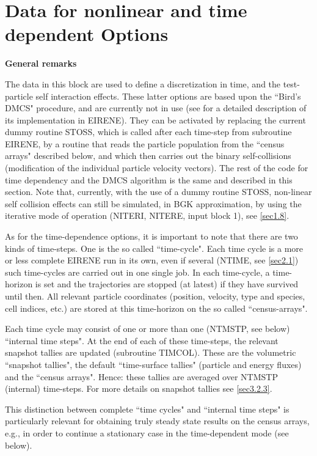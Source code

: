 \section{Data for nonlinear and time dependent Options} \label{sec2.13}

\textbf{General remarks} 

\medskip 

The data in this block are used to define a discretization in time, and the test-particle self interaction effects.
%
These latter options are based upon the ``Bird's \ac{DMCS}" procedure, and are currently not in use (see \cite{kn:Behringer} for a detailed description of its implementation in EIRENE).
They can be activated by replacing the current dummy routine STOSS, which is called after each time-step from subroutine EIRENE, by a routine that reads the particle population from the ``census arrays" described below, and which then carries out the binary self-collisions (modification of the individual particle velocity vectors).
The rest of the code for time dependency and the \ac{DMCS} algorithm is the same and described in this section.
Note that, currently, with the use of a dummy routine STOSS, non-linear self collision effects can still be simulated, in \ac{BGK} approximation, by using the iterative mode of operation (NITERI, NITERE, input block 1), see \cref{sec1.8}.

As for the time-dependence options, it is important to note that there are two kinds of time-steps.
One is the so called ``time-cycle".
Each time cycle is a more or less complete EIRENE run in its own, even if several (NTIME, see \cref{sec2.1}) such time-cycles are carried out in one single job.
In each time-cycle, a time-horizon is set and the trajectories are stopped (at latest) if they have survived until then.
All relevant particle coordinates (position, velocity, type and species, cell indices, etc.) are stored at this time-horizon on the so called ``census-arrays".

Each time cycle may consist of one or more than one (NTMSTP, see below) ``internal time steps".
At the end of each of these time-steps, the relevant snapshot tallies are updated (subroutine TIMCOL).
These are the volumetric ``snapshot tallies", the default ``time-surface tallies" (particle and energy fluxes) and the ``census arrays".
Hence: these tallies are averaged over NTMSTP (internal) time-steps.
For more details on snapshot tallies see \cref{sec3.2.3}.

This distinction between complete ``time cycles" and ``internal time steps" is particularly relevant for obtaining truly steady state results on the census arrays, e.g., in order to continue a stationary case in the time-dependent mode (see below).

